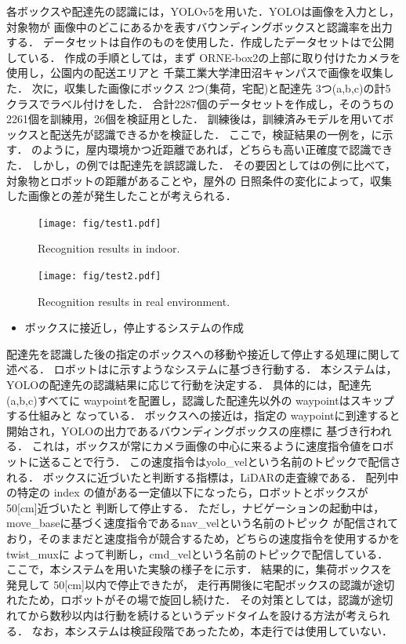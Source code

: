 \documentclass[twocolumn, 9pt]{jsproceedings}
\begin{document}
各ボックスや配達先の認識には，YOLOv5\cite{yolo}を用いた．YOLOは画像を入力とし，対象物が
画像中のどこにあるかを表すバウンディングボックスと認識率を出力する．
データセットは自作のものを使用した．作成したデータセットは\cite{nagashima}で公開している．
作成の手順としては，まず ORNE-box2の上部に取り付けたカメラを使用し，公園内の配送エリアと
千葉工業大学津田沼キャンパスで画像を収集した．
次に，収集した画像にボックス 2つ(集荷，宅配)と配達先 3つ(a,b,c)の計5 クラスでラベル付けをした．
合計2287個のデータセットを作成し，そのうちの2261個を訓練用，26個を検証用とした．
訓練後は，訓練済みモデルを用いてボックスと配送先が認識できるかを検証した．
ここで，検証結果の一例を，に示す．
のように，屋内環境かつ近距離であれば，どちらも高い正確度で認識できた．
しかし，の例では配達先を誤認識した．
その要因としてはの例に比べて，対象物とロボットの距離があることや，屋外の
日照条件の変化によって，収集した画像との差が発生したことが考えられる．

\begin{figure}[h!]
  \centering
  \texttt{[image: fig/test1.pdf]}
  \caption{Recognition results in indoor.}
  \label{fig:test1}
\end{figure}

\begin{figure}[h!]
  \centering
  \texttt{[image: fig/test2.pdf]}
  \caption{Recognition results in real environment.}
  \label{fig:test2}
\end{figure}

\begin{itemize}
  \setlength{\leftskip}{-1zw}
  \item ボックスに接近し，停止するシステムの作成
\end{itemize}
\vspace*{-2.5mm}

配達先を認識した後の指定のボックスへの移動や接近して停止する処理に関して述べる．
ロボットはに示すようなシステムに基づき行動する．
本システムは，YOLOの配達先の認識結果に応じて行動を決定する．
具体的には，配達先(a,b,c)すべてに waypointを配置し，認識した配達先以外の waypointはスキップする仕組みと
なっている．
ボックスへの接近は，指定の waypointに到達すると開始され，YOLOの出力であるバウンディングボックスの座標に
基づき行われる．
これは，ボックスが常にカメラ画像の中心に来るように速度指令値をロボットに送ることで行う．
この速度指令はyolo\_velという名前のトピックで配信される．
ボックスに近づいたと判断する指標は，LiDARの走査線である．
配列中の特定の index の値がある一定値以下になったら，ロボットとボックスが 50[cm]近づいたと
判断して停止する．
ただし，ナビゲーションの起動中は，move\_baseに基づく速度指令であるnav\_velという名前のトピック
が配信されており，そのままだと速度指令が競合するため，どちらの速度指令を使用するかをtwist\_mux\cite{twist}に
よって判断し，cmd\_velという名前のトピックで配信している．
ここで，本システムを用いた実験の様子をに示す．
結果的に，集荷ボックスを発見して 50[cm]以内で停止できたが，
走行再開後に宅配ボックスの認識が途切れたため，ロボットがその場で旋回し続けた．
その対策としては，認識が途切れてから数秒以内は行動を続けるというデッドタイムを設ける方法が考えられる．
なお，本システムは検証段階であったため，本走行では使用していない．
\end{document}
